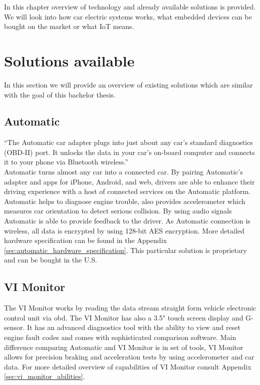 In this chapter overview of technology and already available solutions is provided. We will look into how car electric systems works, what embedded devices can be bought on the market or what IoT means.
\section{Solutions available}
In this section we will provide an overview of existing solutions which are similar with the goal of this bachelor thesis.
\subsection{Automatic}
``The Automatic car adapter plugs into just about any car’s standard diagnostics (OBD-II) port. It unlocks the data in your car’s on-board computer and connects it to your phone via Bluetooth wireless.''\cite{automatic_how}\\
Automatic turns almost any car into a connected car. By pairing Automatic’s adapter and apps for iPhone, Android, and web, drivers are able to enhance their driving experience with a host of connected services on the Automatic platform. Automatic helps to diagnose engine trouble, also provides accelerometer which measures car orientation to detect serious collision. By using audio signals Automatic is able to provide feedback to the driver. As Automatic connection is wireless, all data is encrypted by using 128-bit AES encryption.\cite{automatic_press} More detailed hardware specification can be found in the Appendix \ref{sec:automatic_hardware_specification}. This particular solution is proprietary and can be bought in the U.S.


\subsection{VI Monitor}
The VI Monitor works by reading the data stream straight form vehicle electronic control unit via \gls{obd}. The VI Monitor has also a 3.5" touch screen display and G-sensor. It has an advanced diagnostics tool with the ability to view and reset engine fault codes and comes with sophisticated comparison software. Main difference comparing Automatic and VI Monitor is in set of tools, VI Monitor allows for precision braking and acceleration tests by using accelerometer and car data.\cite{vi_features} For more detailed overview of capabilities of VI Monitor consult Appendix \ref{sec:vi_monitor_abilities}.


